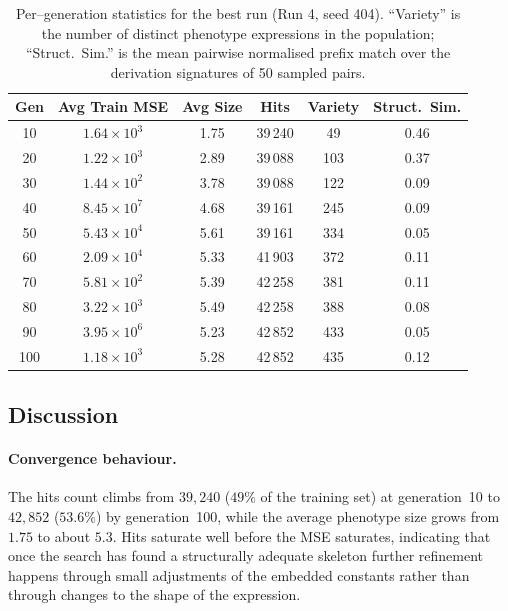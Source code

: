 \documentclass[12pt,a4paper]{article}
\begin{document}
\begin{table}[H]
\centering
\small
\begin{tabular}{c c c c c c}
\toprule
\textbf{Gen} & \textbf{Avg Train MSE} & \textbf{Avg Size} & \textbf{Hits} & \textbf{Variety} & \textbf{Struct.\ Sim.} \\
\midrule
10  & $1.64\!\times\!10^{3}$ & 1.75 & 39\,240 & 49  & 0.46 \\
20  & $1.22\!\times\!10^{3}$ & 2.89 & 39\,088 & 103 & 0.37 \\
30  & $1.44\!\times\!10^{2}$ & 3.78 & 39\,088 & 122 & 0.09 \\
40  & $8.45\!\times\!10^{7}$ & 4.68 & 39\,161 & 245 & 0.09 \\
50  & $5.43\!\times\!10^{4}$ & 5.61 & 39\,161 & 334 & 0.05 \\
60  & $2.09\!\times\!10^{4}$ & 5.33 & 41\,903 & 372 & 0.11 \\
70  & $5.81\!\times\!10^{2}$ & 5.39 & 42\,258 & 381 & 0.11 \\
80  & $3.22\!\times\!10^{3}$ & 5.49 & 42\,258 & 388 & 0.08 \\
90  & $3.95\!\times\!10^{6}$ & 5.23 & 42\,852 & 433 & 0.05 \\
100 & $1.18\!\times\!10^{3}$ & 5.28 & 42\,852 & 435 & 0.12 \\
\bottomrule
\end{tabular}
\caption{Per--generation statistics for the best run (Run 4, seed 404).
``Variety'' is the number of distinct phenotype expressions in the
population; ``Struct.\ Sim.'' is the mean pairwise normalised prefix
match over the derivation signatures of 50 sampled pairs.}
\end{table}

\subsection{Discussion}

\paragraph{Convergence behaviour.}
The hits count climbs from $39{,}240$ ($49\%$ of the training set) at
generation~10 to $42{,}852$ ($53.6\%$) by generation~100, while the
average phenotype size grows from $1.75$ to about $5.3$. Hits saturate
well before the MSE saturates, indicating that once the search has
found a structurally adequate skeleton further refinement happens
through small adjustments of the embedded constants rather than
through changes to the shape of the expression.
\end{document}
